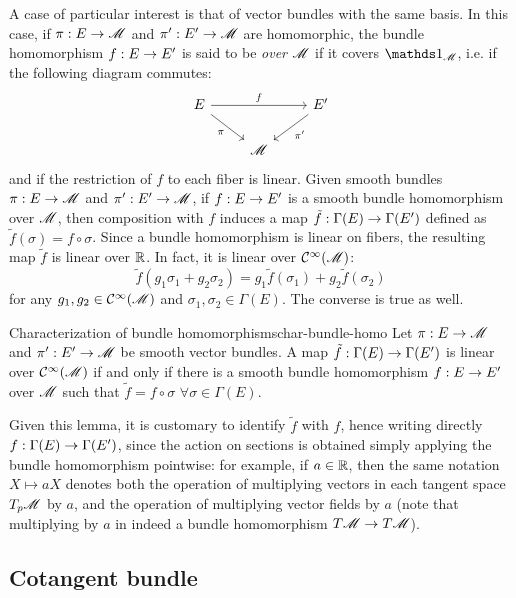 A case of particular interest is that of vector bundles with the same basis. In this case, if $ \pi : E \rightarrow \mathscr{M} $ and $ \pi' : E' \rightarrow \mathscr{M} $ are homomorphic, the bundle homomorphism $ f : E \rightarrow E' $ is said to be \emph{over} $ \mathscr{M} $ if it covers $ \id_\man $, i.e. if the following diagram commutes:
\begin{equation*}
  \begin{tikzcd}
    E \ar[rd , "\pi" , swap] \ar[rr , "f"] & & E' \ar[dl , "\pi'"] \\
                                          & \man &
  \end{tikzcd}
\end{equation*}
and if the restriction of $ f $ to each fiber is linear.
Given smooth bundles $ \pi : E \rightarrow \mathscr{M} $ and $ \pi' : E' \rightarrow \mathscr{M} $, if $ f : E \rightarrow E' $ is a smooth bundle homomorphism over $ \mathscr{M} $, then composition with $ f $ induces a map $ \tilde{f} : \Gamma(E) \rightarrow \Gamma(E') $ defined as $ \tilde{f}(\sigma) = f \circ \sigma $. Since a bundle homomorphism is linear on fibers, the resulting map $ \tilde{f} $ is linear over $ \mathbb{R} $. In fact, it is linear over $ \mathcal{C}^{\infty}(\mathscr{M}) $:
\begin{equation*}
  \tilde{f}(g_1 \sigma_1 + g_2 \sigma_2) = g_1 \tilde{f}(\sigma_1) + g_2 \tilde{f}(\sigma_2)
\end{equation*}
for any $ g_1 , g_2 \in \mathcal{C}^{\infty}(\mathscr{M}) $ and $ \sigma_1 , \sigma_2 \in \Gamma(E) $. The converse is true as well.

\begin{lemma}{Characterization of bundle homomorphisms}{char-bundle-homo}
  Let $ \pi : E \rightarrow \mathscr{M} $ and $ \pi' : E' \rightarrow \mathscr{M} $ be smooth vector bundles. A map $ \tilde{f} : \Gamma(E) \rightarrow \Gamma(E') $ is linear over $ \mathcal{C}^{\infty}(\mathscr{M}) $ if and only if there is a smooth bundle homomorphism $ f : E \rightarrow E' $ over $ \mathscr{M} $ such that $ \tilde{f} = f \circ \sigma \,\,\forall \sigma \in \Gamma(E) $.
\end{lemma}

Given this lemma, it is customary to identify $ \tilde{f} $ with $ f $, hence writing directly $ f : \Gamma(E) \rightarrow \Gamma(E') $, since the action on sections is obtained simply applying the bundle homomorphism pointwise: for example, if $ a \in \mathbb{R} $, then the same notation $ X \mapsto a X $ denotes both the operation of multiplying vectors in each tangent space $ T_p\mathscr{M} $ by $ a $, and the operation of multiplying vector fields by $ a $ (note that multiplying by $ a $ in indeed a bundle homomorphism $ T\mathscr{M} \rightarrow T\mathscr{M} $).

\subsection{Cotangent bundle}

